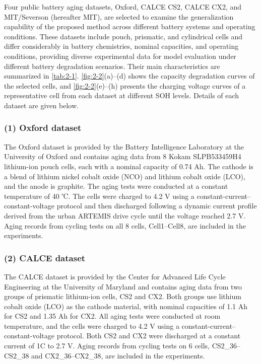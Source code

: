 Four public battery aging datasets, Oxford, CALCE CS2, CALCE CX2, and MIT/Severson (hereafter MIT), are selected to examine the generalization capability of the proposed method across different battery systems and operating conditions. These datasets include pouch, prismatic, and cylindrical cells and differ considerably in battery chemistries, nominal capacities, and operating conditions, providing diverse experimental data for model evaluation under different battery degradation scenarios. Their main characteristics are summarized in \cref{tab:2-1}. \cref{fig:2-2}(a)--(d) shows the capacity degradation curves of the selected cells, and \cref{fig:2-2}(e)--(h) presents the charging voltage curves of a representative cell from each dataset at different SOH levels. Details of each dataset are given below.



\subsubsection*{(1) Oxford dataset}

The Oxford dataset is provided by the Battery Intelligence Laboratory at the University of Oxford and contains aging data from 8 Kokam SLPB533459H4 lithium-ion pouch cells, each with a nominal capacity of 0.74 Ah\cite{ref28}. The cathode is a blend of lithium nickel cobalt oxide (NCO) and lithium cobalt oxide (LCO), and the anode is graphite\cite{ref60}. The aging tests were conducted at a constant temperature of 40 ℃. The cells were charged to 4.2 V using a constant-current--constant-voltage protocol and then discharged following a dynamic current profile derived from the urban ARTEMIS drive cycle until the voltage reached 2.7 V\cite{ref61}. Aging records from cycling tests on all 8 cells, Cell1–Cell8, are included in the experiments.

\subsubsection*{(2) CALCE dataset}

The CALCE dataset is provided by the Center for Advanced Life Cycle Engineering at the University of Maryland and contains aging data from two groups of prismatic lithium-ion cells, CS2 and CX2\cite{ref61,ref18}. Both groups use lithium cobalt oxide (LCO) as the cathode material, with nominal capacities of 1.1 Ah for CS2 and 1.35 Ah for CX2. All aging tests were conducted at room temperature, and the cells were charged to 4.2 V using a constant-current--constant-voltage protocol. Both CS2 and CX2 were discharged at a constant current of 1C to 2.7 V. Aging records from cycling tests on 6 cells, CS2\_36–CS2\_38 and CX2\_36–CX2\_38, are included in the experiments.

